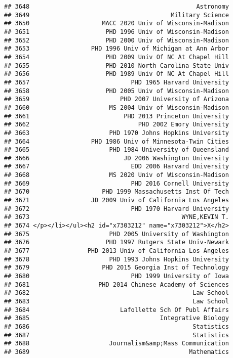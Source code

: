 \documentclass[
]{article}
\begin{document}
\begin{verbatim}
## 3648                                              Astronomy
## 3649                                       Military Science
## 3650                    MACC 2020 Univ of Wisconsin-Madison
## 3651                     PHD 1996 Univ of Wisconsin-Madison
## 3652                     PHD 2000 Univ of Wisconsin-Madison
## 3653                 PHD 1996 Univ of Michigan at Ann Arbor
## 3654                     PHD 2009 Univ Of NC At Chapel Hill
## 3655                     PHD 2010 North Carolina State Univ
## 3656                     PHD 1989 Univ Of NC At Chapel Hill
## 3657                            PHD 1965 Harvard University
## 3658                     PHD 2005 Univ of Wisconsin-Madison
## 3659                         PHD 2007 University of Arizona
## 3660                      MS 2004 Univ of Wisconsin-Madison
## 3661                          PHD 2013 Princeton University
## 3662                              PHD 2002 Emory University
## 3663                      PHD 1970 Johns Hopkins University
## 3664                 PHD 1986 Univ of Minnesota-Twin Cities
## 3665                      PHD 1984 University of Queensland
## 3666                          JD 2006 Washington University
## 3667                            EDD 2006 Harvard University
## 3668                      MS 2020 Univ of Wisconsin-Madison
## 3669                            PHD 2016 Cornell University
## 3670                    PHD 1999 Massachusetts Inst Of Tech
## 3671                 JD 2009 Univ of California Los Angeles
## 3672                            PHD 1970 Harvard University
## 3673                                          WYNE,KEVIN T.
## 3674 </p></li></ul><h2 id="x7303212" name="x7303212">X</h2>
## 3675                      PHD 2005 University of Washington
## 3676                     PHD 1997 Rutgers State Univ-Newark
## 3677                PHD 2013 Univ of California Los Angeles
## 3678                      PHD 1993 Johns Hopkins University
## 3679                    PHD 2015 Georgia Inst of Technology
## 3680                            PHD 1999 University of Iowa
## 3681                   PHD 2014 Chinese Academy of Sciences
## 3682                                             Law School
## 3683                                             Law School
## 3684                         Lafollette Sch Of Publ Affairs
## 3685                                    Integrative Biology
## 3686                                             Statistics
## 3687                                             Statistics
## 3688                      Journalism&amp;Mass Communication
## 3689                                            Mathematics

\end{verbatim}
\end{document}

